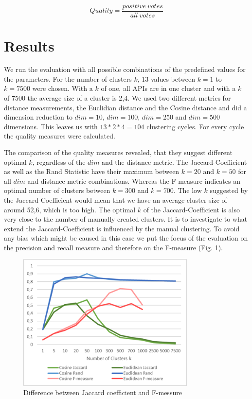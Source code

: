 \documentclass[a4paper]{IEEEtran}
\begin{document}
\begin{equation}
\label{eq:qual}
Quality= \frac{positive~votes}{all~votes}
\end{equation}

\section{Results}
\label{sec:result}
We run the evaluation with all possible combinations of the predefined values for the parameters. For the number of clusters $k$, 13 values between $k=1$ to $k=7500$ were chosen. With a $k$ of one, all APIs are in one cluster and with a $k$ of 7500 the average size of a cluster is 2,4. We used two different metrics for distance measurements, the Euclidian distance and the Cosine distance and did a dimension reduction to $dim⁡= 10$, $dim⁡= 100$, $dim⁡=  250$ and  $dim⁡= 500$ dimensions. This leaves us with $13*2*4=104$ clustering cycles. For every cycle the quality measures were calculated.

The comparison of the quality measures revealed, that they suggest different optimal $k$, regardless of the $dim$ and the distance metric. The Jaccard-Coefficient as well as the Rand Statistic have their maximum between $k=20$ and $k=50$ for all $dim$ and distance metric combinations. Whereas the F-measure indicates an optimal number of clusters between $k=300$ and $k=700$.
The low $k$ suggested by the Jaccard-Coefficient would mean that we have an average cluster size of around 52,6, which is too high. The optimal $k$ of the Jaccard-Coefficient is also very close to the number of manually  created clusters. It is to investigate to what extend the Jaccard-Coefficient is influenced by the manual clustering. To avoid any bias which might be caused in this case we put the focus of the evaluation on the precision and recall measure and therefore on the F-measure (Fig. \ref{fig_sim4}).


\begin{figure}[!t]
\centering
\includegraphics[width= 3.5in]{img/Jaccard.png}
\caption{Difference between Jaccard coefficient and F-messure}
\label{fig_sim4}
\end{figure}
\end{document}
